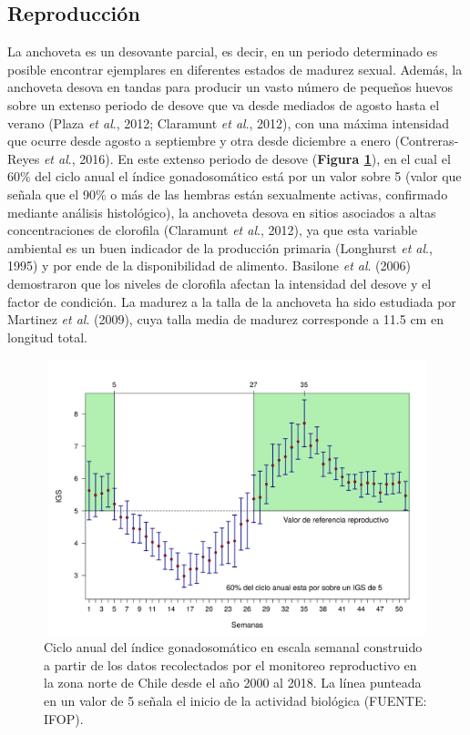 \documentclass[letter,11pt]{article}
\begin{document}
\subsection{Reproducci\'on}

La anchoveta es un desovante parcial, es decir, en un periodo
determinado es posible encontrar ejemplares en diferentes estados de
madurez sexual. Adem\'as, la anchoveta desova en tandas para producir un
vasto n\'umero de peque\~{n}os huevos sobre un extenso periodo de desove que
va desde mediados de agosto hasta el verano (Plaza \textit{et al}.,
2012; Claramunt \textit{et al}., 2012), con una m\'axima intensidad que
ocurre desde agosto a septiembre y otra desde diciembre a enero
(Contreras-Reyes \textit{et al}., 2016). En este extenso periodo de
desove (\textbf{Figura \ref{Fig2}}), en el cual el 60\% del ciclo anual
el \'indice gonadosom\'atico est\'a por un valor sobre 5 (valor que se\~{n}ala que
el 90\% o m\'as de las hembras est\'an sexualmente activas, confirmado
mediante an\'alisis histol\'ogico), la anchoveta desova en sitios asociados
a altas concentraciones de clorofila (Claramunt \textit{et al}., 2012),
ya que esta variable ambiental es un buen indicador de la producci\'on
primaria (Longhurst \textit{et al}., 1995) y por ende de la
disponibilidad de alimento. Basilone \textit{et al}. (2006) demostraron
que los niveles de clorofila afectan la intensidad del desove y el
factor de condici\'on. La madurez a la talla de la anchoveta ha sido
estudiada por Martinez \textit{et al}. (2009), cuya talla media de
madurez corresponde a 11.5 cm en longitud total.

\vspace{0.5cm}
\begin{figure}[htb!]
 \centering
 \includegraphics[width=12cm,height=8cm]{Figuras/figura2.pdf}
 \caption{Ciclo anual del \'indice gonadosom\'atico en escala semanal construido a partir de los datos recolectados por el monitoreo reproductivo en la zona norte de Chile desde el a\~{n}o 2000 al 2018. La l\'inea punteada en un valor de 5 se\~{n}ala el inicio de la actividad biol\'ogica (FUENTE: IFOP).}
 \label{Fig2}
\end{figure}
\end{document}
